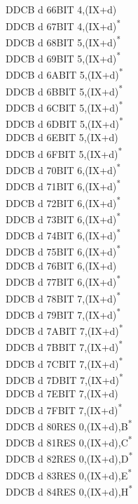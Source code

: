 \documentclass[twoside,openright,a4paper]{book}
\begin{document}
\begin{multicols}{3}
{\begin{tabbing}
	DDCB d 66\>BIT 4,(IX+d)\\
	DDCB d 67\>BIT 4,(IX+d)\textsuperscript{*}\\
	DDCB d 68\>BIT 5,(IX+d)\textsuperscript{*}\\
	DDCB d 69\>BIT 5,(IX+d)\textsuperscript{*}\\
	DDCB d 6A\>BIT 5,(IX+d)\textsuperscript{*}\\
	DDCB d 6B\>BIT 5,(IX+d)\textsuperscript{*}\\
	DDCB d 6C\>BIT 5,(IX+d)\textsuperscript{*}\\
	DDCB d 6D\>BIT 5,(IX+d)\textsuperscript{*}\\
	DDCB d 6E\>BIT 5,(IX+d)\\
	DDCB d 6F\>BIT 5,(IX+d)\textsuperscript{*}\\
	DDCB d 70\>BIT 6,(IX+d)\textsuperscript{*}\\
	DDCB d 71\>BIT 6,(IX+d)\textsuperscript{*}\\
	DDCB d 72\>BIT 6,(IX+d)\textsuperscript{*}\\
	DDCB d 73\>BIT 6,(IX+d)\textsuperscript{*}\\
	DDCB d 74\>BIT 6,(IX+d)\textsuperscript{*}\\
	DDCB d 75\>BIT 6,(IX+d)\textsuperscript{*}\\
	DDCB d 76\>BIT 6,(IX+d)\\
	DDCB d 77\>BIT 6,(IX+d)\textsuperscript{*}\\
	DDCB d 78\>BIT 7,(IX+d)\textsuperscript{*}\\
	DDCB d 79\>BIT 7,(IX+d)\textsuperscript{*}\\
	DDCB d 7A\>BIT 7,(IX+d)\textsuperscript{*}\\
	DDCB d 7B\>BIT 7,(IX+d)\textsuperscript{*}\\
	DDCB d 7C\>BIT 7,(IX+d)\textsuperscript{*}\\
	DDCB d 7D\>BIT 7,(IX+d)\textsuperscript{*}\\
	DDCB d 7E\>BIT 7,(IX+d)\\
	DDCB d 7F\>BIT 7,(IX+d)\textsuperscript{*}\\
	DDCB d 80\>RES 0,(IX+d),B\textsuperscript{*}\\
	DDCB d 81\>RES 0,(IX+d),C\textsuperscript{*}\\
	DDCB d 82\>RES 0,(IX+d),D\textsuperscript{*}\\
	DDCB d 83\>RES 0,(IX+d),E\textsuperscript{*}\\
	DDCB d 84\>RES 0,(IX+d),H\textsuperscript{*}\\

\end{tabbing}}
\end{multicols}
\end{document}
